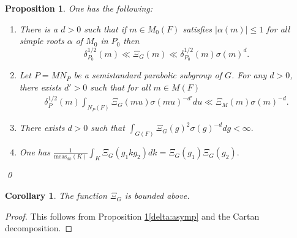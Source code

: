 \documentclass[12pt]{amsart}
\newtheorem{cor}[thm]{Corollary}
\newtheorem{prop}[thm]{Proposition}
\theoremstyle{remark}
\numberwithin{equation}{section}
\theoremstyle{definition}
\numberwithin{equation}{subsection}
\begin{document}
\begin{prop}\label{prop:HCfunction}
 One has the following: 
    \begin{enumerate}[label=(\roman*)]
\item \label{delta:asymp} There is a $d>0$ such that if $m \in M_0(F)$ satisfies $|\alpha(m)| \leq 1$ for all simple roots $\alpha$ of $M_0$ in $P_0$ then
$$
\delta_{P_0}^{1/2}(m) \ll \Xi_G(m) \ll \delta_{P_0}^{1/2}(m)\sigma(m)^d.
$$

    
        \item \label{descent} Let $P=MN_P$ be a semistandard parabolic subgroup of $G$. For any $d>0$, there exists $d'>0$ such that for all $m\in M(F)$
        \begin{align*}
            \delta_P^{1/2}(m)\int_{N_P(F)} \Xi_G(mu)\sigma(mu)^{-d'}du\ll \Xi_M(m)\sigma(m)^{-d}.
        \end{align*}
        
        \item \label{convergence}There exists $d>0$ such that $\int_{G(F)} \Xi_G(g)^2\sigma(g)^{-d}dg<\infty.$

        \item \label{doubling} One has $           \frac{1}{\mathrm{meas}_{dk}(K)}\int_{K} \Xi_G(g_1kg_2)dk=\Xi_G(g_1)\Xi_G(g_2).$
    \end{enumerate}\qed
\end{prop}



\begin{cor} \label{cor:xi:bounded}
    The function $\Xi_G$ is bounded above.
\end{cor}

\begin{proof}
  This follows from Proposition \ref{prop:HCfunction}\ref{delta:asymp} and the Cartan decomposition.
\end{proof}
\end{document}
